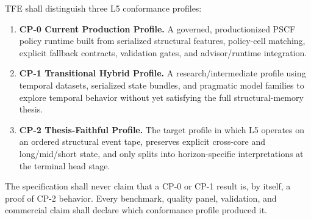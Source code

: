 \documentclass[11pt]{report}
\begin{document}
TFE shall distinguish three L5 conformance profiles:
\begin{enumerate}[leftmargin=1.2cm]
    \item \textbf{CP-0 Current Production Profile.} A governed, productionized PSCF policy runtime built from serialized structural features, policy-cell matching, explicit fallback contracts, validation gates, and advisor/runtime integration.
    \item \textbf{CP-1 Transitional Hybrid Profile.} A research/intermediate profile using temporal datasets, serialized state bundles, and pragmatic model families to explore temporal behavior without yet satisfying the full structural-memory thesis.
    \item \textbf{CP-2 Thesis-Faithful Profile.} The target profile in which L5 operates on an ordered structural event tape, preserves explicit cross-core and long/mid/short state, and only splits into horizon-specific interpretations at the terminal head stage.
\end{enumerate}

The specification shall never claim that a CP-0 or CP-1 result is, by itself, a proof of CP-2 behavior. Every benchmark, quality panel, validation, and commercial claim shall declare which conformance profile produced it.
\end{document}
